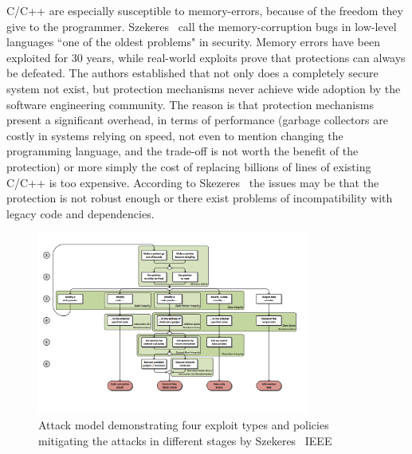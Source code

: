 \documentclass[nomenclature, english, bibtex]{kththesis}
\begin{document}
C/C++ are especially susceptible to \gls{memory-error}s, because of the freedom they give to the programmer. Szekeres \etal\,\cite{szekeres_sok_2013} call the \gls{memory-corruption} bugs in low-level languages ``one of the oldest problems" in security. Memory errors have been exploited for 30 years, while real-world exploits prove that protections can always be defeated. The authors established that not only does a completely secure system not exist, but protection mechanisms never achieve wide adoption by the software engineering community. The reason is that protection mechanisms present a significant overhead, in terms of performance (\eg garbage collectors are costly in systems relying on speed, not even to mention changing the programming language, and the trade-off is not worth the benefit of the protection) or more simply the cost of replacing billions of lines of existing C/C++ is too expensive. According to Skezeres \etal\,\cite{szekeres_sok_2013} the issues may be that the protection is not robust enough or there exist problems of incompatibility with legacy code and dependencies.

\begin{figure}
  \begin{center}
    \includegraphics[width=0.8\textwidth]{figures/sok.png}
  \end{center}
  \caption[Attack model demonstrating four exploit types and policies mitigating the attacks in different stages by Szekeres \etal\,]{Attack model demonstrating four exploit types and policies mitigating the attacks in different stages by Szekeres \etal\,\cite{szekeres_sok_2013}   IEEE}
  \label{fig:sok}
\end{figure}
\end{document}
